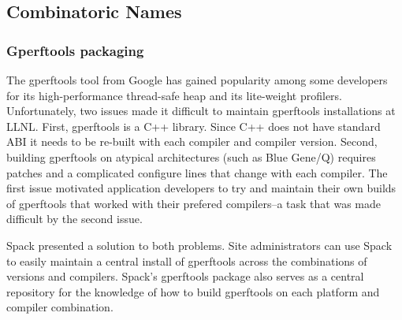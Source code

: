 
\subsection{Combinatoric Names}
\label{sec:usecase-combinatoric}


\subsubsection{Gperftools packaging}

The gperftools tool from Google has gained popularity among some developers for its high-performance thread-safe heap and its lite-weight profilers.  Unfortunately, two issues made it difficult to maintain gperftools installations at LLNL.  First, gperftools is a C++ library.  Since C++ does not have standard ABI it needs to be re-built with each compiler and compiler version.  Second, building gperftools on atypical architectures (such as Blue Gene/Q) requires patches and a complicated configure lines that change with each compiler.  The first issue motivated application developers to try and maintain their own builds of gperftools that worked with their prefered compilers--a task that was made difficult by the second issue.

Spack presented a solution to both problems.  Site administrators can use Spack to easily maintain a central install of gperftools across the combinations of versions and compilers.  Spack's gperftools package also serves as a central repository for the knowledge of how to build gperftools on each platform and compiler combination.  

